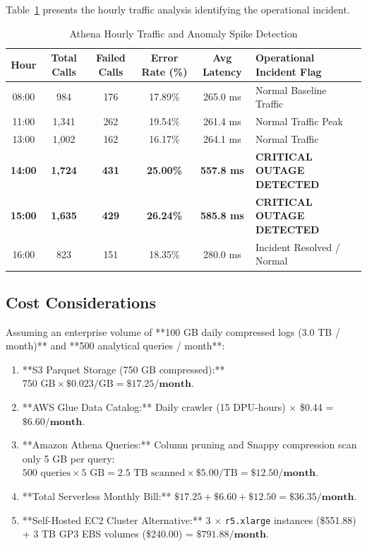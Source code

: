 \documentclass[12pt,a4paper]{report}
\begin{document}
Table~\ref{tab:cloud_hourly_results} presents the hourly traffic analysis identifying the operational incident.

\begin{table}[H]
\centering
\caption{Athena Hourly Traffic and Anomaly Spike Detection}
\label{tab:cloud_hourly_results}
\begin{tabularx}{\textwidth}{|c|c|c|c|c|X|}
\hline
\textbf{Hour} & \textbf{Total Calls} & \textbf{Failed Calls} & \textbf{Error Rate (\%)} & \textbf{Avg Latency} & \textbf{Operational Incident Flag}\\
\hline
08:00 & 984 & 176 & 17.89\% & 265.0 ms & Normal Baseline Traffic\\
\hline
11:00 & 1,341 & 262 & 19.54\% & 261.4 ms & Normal Traffic Peak\\
\hline
13:00 & 1,002 & 162 & 16.17\% & 264.1 ms & Normal Traffic\\
\hline
\textbf{14:00} & \textbf{1,724} & \textbf{431} & \textbf{25.00\%} & \textbf{557.8 ms} & \textbf{CRITICAL OUTAGE DETECTED}\\
\hline
\textbf{15:00} & \textbf{1,635} & \textbf{429} & \textbf{26.24\%} & \textbf{585.8 ms} & \textbf{CRITICAL OUTAGE DETECTED}\\
\hline
16:00 & 823 & 151 & 18.35\% & 280.0 ms & Incident Resolved / Normal\\
\hline
\end{tabularx}
\end{table}

\subsection{Cost Considerations}
Assuming an enterprise volume of **100 GB daily compressed logs (3.0 TB / month)** and **500 analytical queries / month**:
\begin{enumerate}
    \item **S3 Parquet Storage (750 GB compressed):** $750\text{ GB} \times \$0.023/\text{GB} = \mathbf{\$17.25/\text{month}}$.
    \item **AWS Glue Data Catalog:** Daily crawler (15 DPU-hours) $\times$ \$0.44 = $\mathbf{\$6.60/\text{month}}$.
    \item **Amazon Athena Queries:** Column pruning and Snappy compression scan only 5 GB per query:  
    $500\text{ queries} \times 5\text{ GB} = 2.5\text{ TB scanned} \times \$5.00/\text{TB} = \mathbf{\$12.50/\text{month}}$.
    \item **Total Serverless Monthly Bill:** $\$17.25 + \$6.60 + \$12.50 = \mathbf{\$36.35/\text{month}}$.
    \item **Self-Hosted EC2 Cluster Alternative:** 3 $\times$ \texttt{r5.xlarge} instances (\$551.88) + 3 TB GP3 EBS volumes (\$240.00) = $\mathbf{\$791.88/\text{month}}$.
\end{enumerate}
\end{document}
